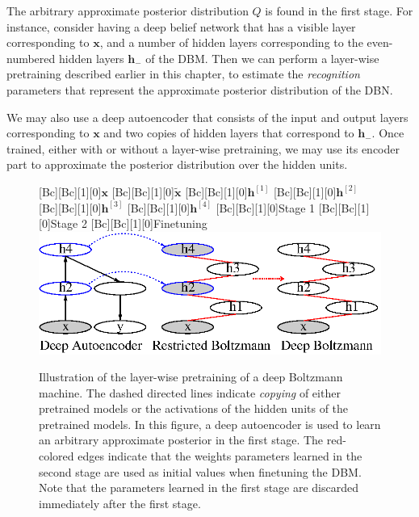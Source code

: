 \documentclass[dissertation,nocontribution,draft*]{aaltoseries}
\newcommand{\qlay}[1]{\left[#1\right]}
\newcommand{\vect}[1]{\mathbf{#1}}
\newcommand{\vh}[0]{\vect{h}}
\newcommand{\vx}[0]{\vect{x}}
\begin{document}
The arbitrary approximate posterior distribution $Q$ is
found in the first stage. For instance, consider having a
deep belief network that has a visible layer corresponding
to $\vx$, and a number of hidden layers corresponding to the
even-numbered hidden layers $\vh_-$ of the DBM. Then we can
perform a layer-wise pretraining described earlier in this
chapter, to estimate the \textit{recognition} parameters
that represent the approximate posterior distribution of the
DBN. 

We may also use a deep autoencoder that consists of the
input and output layers corresponding to $\vx$ and two
copies of hidden layers that correspond to $\vh_-$. Once
trained, either with or without a layer-wise pretraining, we
may use its encoder part to approximate the posterior
distribution over the hidden units.

\begin{figure}[t]
    \centering
    [Bc][Bc][1][0]{$\vx$}
    [Bc][Bc][1][0]{$\tilde{\vx}$}
    [Bc][Bc][1][0]{$\vh^{\qlay{1}}$}
    [Bc][Bc][1][0]{$\vh^{\qlay{2}}$}
    [Bc][Bc][1][0]{$\vh^{\qlay{3}}$}
    [Bc][Bc][1][0]{$\vh^{\qlay{4}}$}
    [Bc][Bc][1][0]{Stage 1}
    [Bc][Bc][1][0]{Stage 2}
    [Bc][Bc][1][0]{Finetuning}
    \includegraphics[width=0.85\columnwidth]{figures/pretrain_dbm2.eps}
    \caption{Illustration of the layer-wise pretraining of
    a deep Boltzmann machine. The dashed directed lines
    indicate \textit{copying} of either pretrained models or
    the activations of the hidden units of the pretrained
    models. In this figure, a deep autoencoder is used to
    learn an arbitrary approximate posterior in the first
    stage. The red-colored edges indicate that the weights
    parameters learned in the second stage are used as
    initial values when finetuning the DBM. Note that the
    parameters learned in the first stage are discarded
    immediately after the first stage.}
    \label{fig:two_stage_pretraining}
\end{figure}
\end{document}
